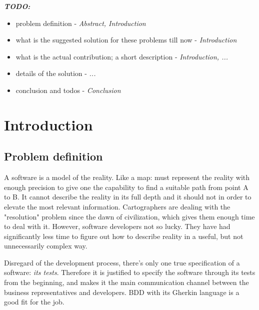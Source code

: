 \documentclass[conference]{IEEEtran}
\begin{document}
%
\IEEEpeerreviewmaketitle

\textbf{\textit{TODO:}}
\begin{itemize}
    \item problem definition - \textit{Abstract, Introduction}
    \item what is the suggested solution for these problems till now - \textit{Introduction}
    \item what is the actual contribution; a short description - \textit{Introduction, ...}
    \item details of the solution - \textit{...}
    \item conclusion and todos - \textit{Conclusion}
\end{itemize}

\section{Introduction}
\subsection{Problem definition}


A software is a model of the reality. Like a map: must represent the reality with enough precision to give one the capability to find a suitable path from point A to B. It cannot describe the reality in its full depth and it should not in order to elevate the most relevant information. Cartographers are dealing with the "resolution" problem since the dawn of civilization, which gives them enough time to deal with it. However, software developers not so lucky. They have had significantly less time to figure out how to describe reality in a useful, but not unnecessarily complex way.

Disregard of the development process, there's only one true specification of a software: \textit{its tests}. Therefore it is justified to specify the software through its tests from the beginning, and makes it the main communication channel between the business representatives and developers. BDD with its Gherkin language is a good fit for the job.
\end{document}

